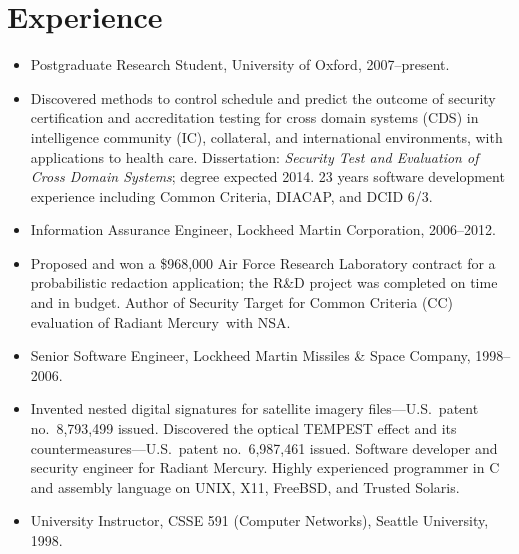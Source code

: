 \documentclass[12pt,twoside,letterpaper]{article}
\providecommand{\rmtrademark}{\raisebox{\height}{\tiny (TM)}}
\newenvironment{myquote}{\list{}{\leftmargin=0.15in\rightmargin=0in}\item[]}{\endlist}
\begin{document}
\section*{Experience}
\vspace{-2mm}
\begin{itemize}
	\item Postgraduate Research Student, University of Oxford, 2007--present.
		\vspace{-2mm}
		\begin{myquote}
			Discovered methods to control schedule and predict the outcome of
			security certification and accreditation 
			testing for cross domain systems (CDS) in intelligence community
			(IC), collateral, and international environments, with applications
			to health care.
			Dissertation: \emph{Security Test and Evaluation of Cross Domain
			Systems}; degree expected 2014.  23 years software development
			experience including Common Criteria, DIACAP, and DCID 6/3.
		\end{myquote}
\vspace{-2.5mm}
	\item Information Assurance Engineer, Lockheed Martin Corporation, 2006--2012.
		\vspace{-2mm}
		\begin{myquote}
			Proposed and won a \$968,000 Air Force Research Laboratory contract
			for a probabilistic redaction application; the R\&D project was completed
			on time and in budget.  Author of Security Target for Common Criteria
			(CC) evaluation of Radiant Mercury\rmtrademark\ with
			NSA.
		\end{myquote}
\vspace{-2.5mm}
	\item Senior Software Engineer, Lockheed Martin Missiles \& Space Company, 1998--2006.
		\vspace{-2mm}
		\begin{myquote}
			Invented nested digital signatures for satellite imagery files---U.S.\ patent
			no.~8,793,499 issued. Discovered the optical TEMPEST
			effect and its countermeasures---U.S.\ patent no.~6,987,461 issued.
			Software developer and security engineer for Radiant Mercury\rmtrademark.
			Highly experienced programmer in C and assembly language on UNIX, X11,
			FreeBSD, and Trusted Solaris.
		\end{myquote}
\vspace{-2.5mm}
    \item University Instructor, CSSE 591 (Computer Networks), Seattle University, 1998.
\end{itemize}
\end{document}
